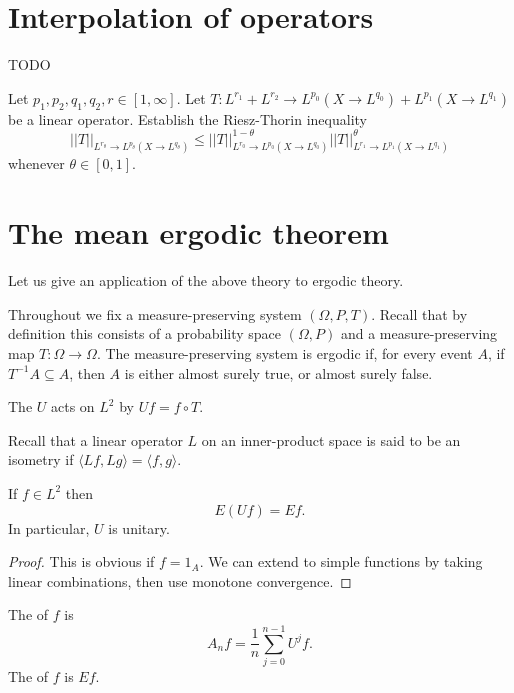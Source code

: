 \section{Interpolation of operators}
TODO

\begin{exercise}
Let $p_1,p_2,q_1,q_2,r \in [1, \infty]$. Let $T: L^{r_1} + L^{r_2} \to L^{p_0}(X \to L^{q_0}) + L^{p_1}(X \to L^{q_1})$ be a linear operator.
Establish the Riesz-Thorin inequality
\[||T||_{L^{r_\theta} \to L^{p_\theta}(X \to L^{q_\theta})} \leq ||T||_{L^{r_0} \to L^{p_0}(X \to L^{q_0})}^{1 - \theta} ||T||_{L^{r_1} \to L^{p_1}(X \to L^{q_1})}^\theta\]
whenever $\theta \in [0, 1]$.
\end{exercise}

\section{The mean ergodic theorem}
Let us give an application of the above theory to ergodic theory.

Throughout we fix a measure-preserving system $(\Omega, P, T)$.
Recall that by definition this consists of a probability space $(\Omega, P)$ and a measure-preserving map $T: \Omega \to \Omega$.
The measure-preserving system is ergodic if, for every event $A$, if $T^{-1}A \subseteq A$, then $A$ is either almost surely true, or almost surely false.

\begin{definition}
The  $U$ acts on $L^2$ by $Uf = f \circ T$.
\end{definition}

Recall that a linear operator $L$ on an inner-product space is said to be an isometry if $\langle Lf, Lg\rangle = \langle f, g\rangle$.

\begin{lemma}
If $f \in L^2$ then
\[E(Uf) = Ef.\]
In particular, $U$ is unitary.
\end{lemma}
\begin{proof}
This is obvious if $f = 1_A$.
We can extend to simple functions by taking linear combinations, then use monotone convergence.
\end{proof}

\begin{definition}
The  of $f$ is
\[A_nf = \frac{1}{n} \sum_{j=0}^{n-1} U^jf.\]
The  of $f$ is $Ef$.
\end{definition}

